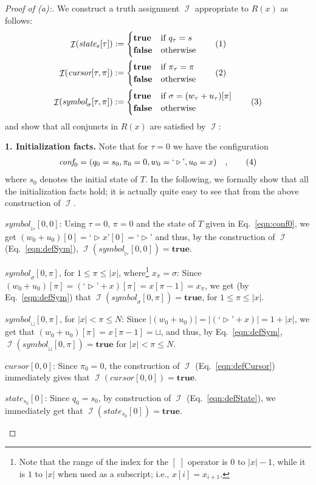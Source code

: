 \documentclass [11pt]{article}
\newcommand{\blank}{\sqcup}
\newcommand{\ssym}{\triangleright}
\newcommand{\sym}[3]{\textit{symbol}_{#1}[#2,#3]}
\newcommand{\cursor}[2]{\textit{cursor}[#1,#2]}
\newcommand{\state}[2]{\textit{state}_{#1}[#2]}
\newcommand{\conf}{\textit{conf}}
\newcommand{\pt}{\ensuremath{\pi_{\tau}}}
\newcommand{\qt}{\ensuremath{q_{\tau}}}
\newcommand{\wt}{\ensuremath{w_{\tau}}}
\newcommand{\ut}{\ensuremath{u_{\tau}}}
\newcommand{\lqm}{\text{`}}
\newcommand{\rqm}{\text{'}}
\DeclareMathOperator{\II}{\mathcal{I}}
\newcommand{\True}{\mathbf{true}}
\newcommand{\False}{\mathbf{false}}
\newcommand\numberthis{\addtocounter{equation}{1}\tag{\theequation}}
\newcommand\neqn[1]{\numberthis\label{eqn:#1}}
\begin{document}
\begin{proof}[Proof of (a):]
We construct a truth assignment $\II$ appropriate to $R(x)$ as follows:
\begin{align*}
\II(\state{s}{\tau}) &:=  
  \begin{cases}
    \True  & \text{if } \qt = s\\
    \False & \text{otherwise}
  \end{cases} \neqn{defState}\\
\II(\cursor{\tau}{\pi}) &:= 
  \begin{cases}
    \True & \text{if } \pt = \pi\\
    \False & \text{otherwise}
  \end{cases}\neqn{defCursor}\\
\II(\sym{\sigma}{\tau}{\pi}) &:=
  \begin{cases}
    \True & \text{if } \sigma = (\wt+\ut)[\pi]\\
    \False & \text{otherwise}
  \end{cases} \neqn{defSym}
\end{align*}
and show that all conjuncts in $R(x)$ are satisfied by $\II$:

\medskip
\noindent
{\bf 1. Initialization facts.} 
Note that for $\tau = 0$ we have the configuration 
\begin{align*}
\conf_0 = (q_0=s_0, \pi_0=0, w_0=\lqm\ssym\rqm, u_0=x) \quad ,\neqn{conf0}
\end{align*}
where $s_0$ denotes the initial state of $T$. In the following, we formally show that all the initialization facts hold; it is actually quite easy to see that from the above construction of $\II$.

\begin{compactitem}
\item $\sym{\ssym}{0}{0}$: Using $\tau=0$, $\pi=0$ and the state of $T$ given in Eq.~\ref{eqn:conf0}, we get $(w_0+u_0)[0] = \lqm\ssym x \rqm[0] = \lqm\ssym\rqm$ and thus, by the construction of $\II$ (Eq.~\ref{eqn:defSym}), $\II(\sym{\ssym}{0}{0}) = \True$.
\item $\sym{\sigma}{0}{\pi}$, for $1\leq \pi \leq |x|$, where\footnote{Note that the range of the index for the $[\;]$ operator is $0$ to $|x|-1$, while it is $1$ to $|x|$ when used as a subscript; i.e., $x[i]=x_{i+1}$.} $x_\pi=\sigma$: Since $(w_0+u_0)[\pi] = (\lqm\ssym\rqm + x)[\pi] = x[\pi-1] = x_{\pi}$, we get (by Eq.~\ref{eqn:defSym}) that $\II(\sym{\sigma}{0}{\pi}) = \True$, for $1\leq \pi \leq |x|$.
\item $\sym{\blank}{0}{\pi}$, for $|x| < \pi\leq N$: Since $|(w_0+u_0)| = |(\lqm\ssym\rqm + x)| = 1 + |x|$, we get that $(w_0+u_0)[\pi] = x[\pi-1] =  \blank$, and thus, by Eq.~\ref{eqn:defSym}, $\II(\sym{\blank}{0}{\pi})=\True$ for $|x| < \pi\leq N$.
\item $\cursor{0}{0}$: Since $\pi_0 = 0$, the construction of $\II$ (Eq.~\ref{eqn:defCursor}) immediately gives that $\II(\cursor{0}{0}) = \True$.
\item $\state{s_0}{0}$: Since $q_0 = s_0$, by construction of $\II$ (Eq.~\ref{eqn:defState}), we immediately get that $\II(\state{s_0}{0}) = \True$.
\end{compactitem}


\end{proof}
\end{document}
